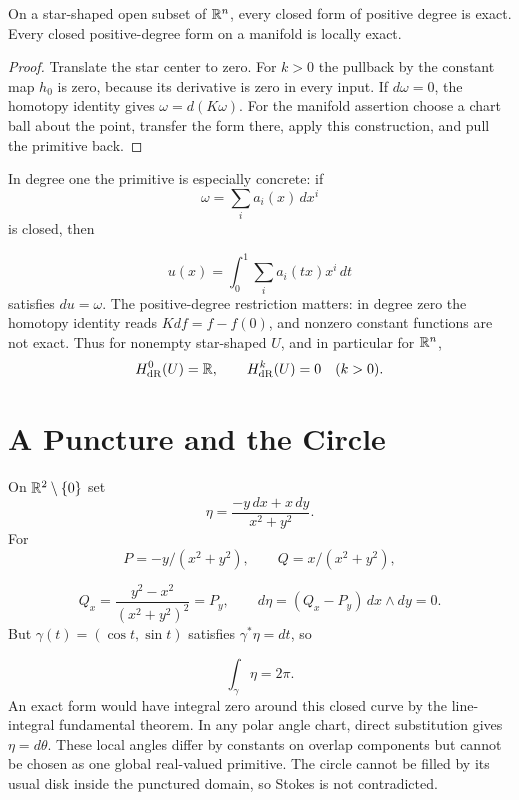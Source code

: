 \begin{theorem}\label{thm:poincare-star}
On a star-shaped open subset of $\mathbb{R}^n$, every closed form of positive
degree is exact. Every closed positive-degree form on a manifold is locally exact.
\end{theorem}
\begin{proof}
Translate the star center to zero. For $k>0$ the pullback by the constant
map $h_0$ is zero, because its derivative is zero in every input.
If $d\omega=0$, the homotopy identity gives $\omega=d(K\omega)$.
For the manifold assertion choose a chart ball about the point, transfer
the form there, apply this construction, and pull the primitive back.
\end{proof}
In degree one the primitive is especially concrete:
if
\[
\omega=\sum_i a_i(x)\,dx^i
\]
 is closed, then

\[
u(x)=\int_0^1\sum_i a_i(tx)x^i\,dt
\]
 satisfies $du=\omega$.
The positive-degree restriction matters: in degree zero the homotopy
identity reads $Kdf=f-f(0)$, and nonzero constant functions are not exact.
Thus for nonempty star-shaped $U$, and in particular for $\mathbb{R}^n$,
\[
H_{\mathrm{dR}}^0(U)=\mathbb{R},\qquad H_{\mathrm{dR}}^k(U)=0\quad(k>0).
\]

\section{A Puncture and the Circle}
\label{sec:circle-cohomology}
\begin{example}\label{ex:angular-cohomology}
On $\mathbb{R}^2\setminus\{0\}$ set
\[
\eta=\frac{-y\,dx+x\,dy}{x^2+y^2}.
\]
For
\[
P=-y/(x^2+y^2),\qquad Q=x/(x^2+y^2),
\]

\[
Q_x=\frac{y^2-x^2}{(x^2+y^2)^2}=P_y,
\qquad d\eta=(Q_x-P_y)\,dx\wedge dy=0.
\]
But $\gamma(t)=(\cos t,\sin t)$ satisfies $\gamma^*\eta=dt$, so

\[
\int_\gamma\eta=2\pi.
\]
 An exact form would have integral zero around
this closed curve by the line-integral fundamental theorem.
In any polar angle chart, direct substitution gives $\eta=d\theta$.
These local angles differ by constants on overlap components but cannot
be chosen as one global real-valued primitive. The circle cannot be filled
by its usual disk inside the punctured domain, so Stokes is not contradicted.
\end{example}

